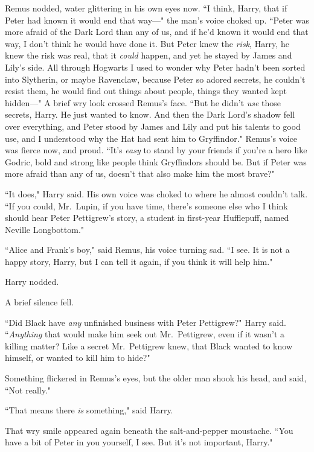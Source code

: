 Remus nodded, water glittering in his own eyes now. ``I think, Harry, that if Peter had known it would end that way---" the man's voice choked up. ``Peter was more afraid of the Dark Lord than any of us, and if he'd known it would end that way, I don't think he would have done it. But Peter knew the \emph{risk}, Harry, he knew the risk was real, that it \emph{could} happen, and yet he stayed by James and Lily's side. All through Hogwarts I used to wonder why Peter hadn't been sorted into Slytherin, or maybe Ravenclaw, because Peter so adored secrets, he couldn't resist them, he would find out things about people, things they wanted kept hidden---" A brief wry look crossed Remus's face. ``But he didn't \emph{use} those secrets, Harry. He just wanted to know. And then the Dark Lord's shadow fell over everything, and Peter stood by James and Lily and put his talents to good use, and I understood why the Hat had sent him to Gryffindor." Remus's voice was fierce now, and proud. ``It's \emph{easy} to stand by your friends if you're a hero like Godric, bold and strong like people think Gryffindors should be. But if Peter was more afraid than any of us, doesn't that also make him the most brave?"

``It does," Harry said. His own voice was choked to where he almost couldn't talk. ``If you could, Mr.~Lupin, if you have time, there's someone else who I think should hear Peter Pettigrew's story, a student in first-year Hufflepuff, named Neville Longbottom."

``Alice and Frank's boy," said Remus, his voice turning sad. ``I see. It is not a happy story, Harry, but I can tell it again, if you think it will help him."

Harry nodded.

A brief silence fell.

``Did Black have \emph{any} unfinished business with Peter Pettigrew?" Harry said. ``\emph{Anything} that would make him seek out Mr.~Pettigrew, even if it wasn't a killing matter? Like a secret Mr.~Pettigrew knew, that Black wanted to know himself, or wanted to kill him to hide?"

Something flickered in Remus's eyes, but the older man shook his head, and said, ``Not really."

``That means there \emph{is} something," said Harry.

That wry smile appeared again beneath the salt-and-pepper moustache. ``You have a bit of Peter in you yourself, I see. But it's not important, Harry."

